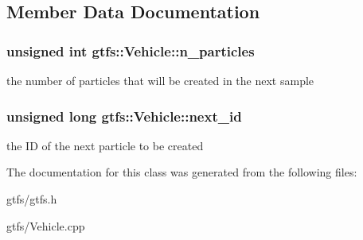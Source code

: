 \subsection{Member Data Documentation}
\subsubsection[{\texorpdfstring{n\+\_\+particles}{n_particles}}]{\setlength{\rightskip}{0pt plus 5cm}unsigned int gtfs\+::\+Vehicle\+::n\+\_\+particles}\hypertarget{classgtfs_1_1Vehicle_aa21babc8423abf92bbdf5e0748444f44}{}\label{classgtfs_1_1Vehicle_aa21babc8423abf92bbdf5e0748444f44}
the number of particles that will be created in the next sample 
\subsubsection[{\texorpdfstring{next\+\_\+id}{next_id}}]{\setlength{\rightskip}{0pt plus 5cm}unsigned long gtfs\+::\+Vehicle\+::next\+\_\+id}\hypertarget{classgtfs_1_1Vehicle_aab535dd9953f9650e2adc351965779b1}{}\label{classgtfs_1_1Vehicle_aab535dd9953f9650e2adc351965779b1}
the ID of the next particle to be created 

The documentation for this class was generated from the following files\+:\begin{DoxyCompactItemize}
\item 
gtfs/gtfs.\+h\item 
gtfs/Vehicle.\+cpp\end{DoxyCompactItemize}
